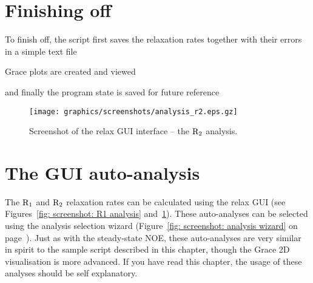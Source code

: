 \section{Finishing off}

To finish off, the script first saves the relaxation rates together with their errors in a simple text file


Grace plots are created and viewed











and finally the program state is saved for future reference



\begin{figure}
\centerline{\texttt{[image: graphics/screenshots/analysis\_r2.eps.gz]}}
\caption[GUI screenshot -- $\Rtwo$ analysis]{Screenshot of the relax GUI interface -- the $\Rtwo$ analysis.}\label{fig: screenshot: R2 analysis}
\end{figure}




\section{The GUI auto-analysis}

The $\mathrm{R}_1$ and $\Rtwo$ relaxation rates can be calculated using the relax GUI (see Figures~\ref{fig: screenshot: R1 analysis} and~\ref{fig: screenshot: R2 analysis}).  These auto-analyses can be selected using the analysis selection wizard (Figure~\ref{fig: screenshot: analysis wizard} on page~\pageref{fig: screenshot: analysis wizard}).  Just as with the steady-state NOE, these auto-analyses are very similar in spirit to the sample script described in this chapter, though the Grace 2D visualisation is more advanced.  If you have read this chapter, the usage of these analyses should be self explanatory.


